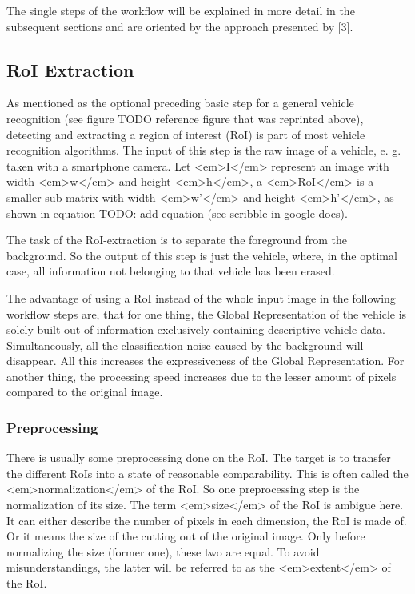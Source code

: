 The single steps of the workflow will be explained in more detail in the subsequent sections and are oriented by the approach presented by [3].

\subsection{RoI Extraction}\label{sec:roiExtraction}
As mentioned as the optional preceding basic step for a general vehicle recognition (see figure TODO reference figure that was reprinted above), detecting and extracting a region of interest (RoI) is part of most vehicle recognition algorithms. The input of this step is the raw image of a vehicle, e. g. taken with a smartphone camera.
Let <em>I</em> represent an image with width <em>w</em> and height <em>h</em>, a <em>RoI</em> is a smaller sub-matrix with width <em>w’</em> and height <em>h’</em>, as shown in equation TODO: add equation (see scribble in google docs).

The task of the RoI-extraction is to separate the foreground from the background. So the output of this step is just the vehicle, where, in the optimal case, all information not belonging to that vehicle has been erased.

The advantage of using a RoI instead of the whole input image in the following workflow steps are, that for one thing, the Global Representation of the vehicle is solely built out of information exclusively containing descriptive vehicle data. Simultaneously, all the classification-noise caused by the background will disappear. All this increases the expressiveness of the Global Representation. For another thing, the processing speed increases due to the lesser amount of pixels compared to the original image.

\subsubsection{Preprocessing}
There is usually some preprocessing done on the RoI. The target is to transfer the different RoIs into a state of reasonable comparability. This is often called the <em>normalization</em> of the RoI. So one preprocessing step is the normalization of its size. The term <em>size</em> of the RoI is ambigue here. It can either describe the number of pixels in each dimension, the RoI is made of. Or it means the size of the cutting out of the original image. Only before normalizing the size (former one), these two are equal. To avoid misunderstandings, the latter will be referred to as the <em>extent</em> of the RoI.

